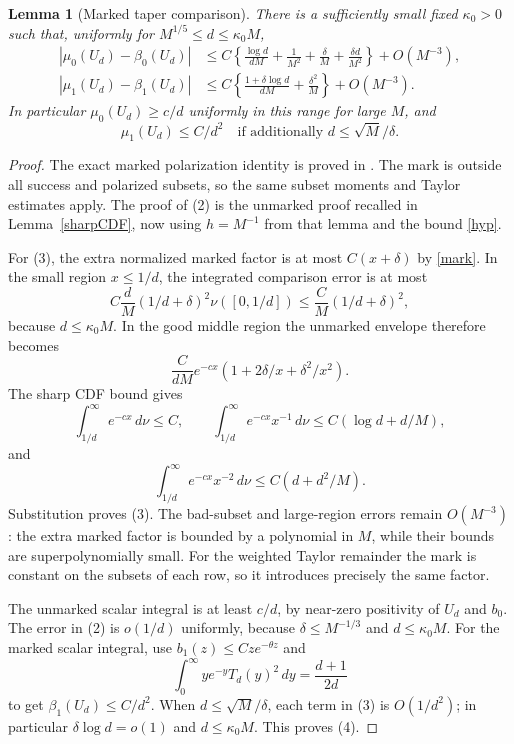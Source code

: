 \documentclass[11pt]{article}
\newtheorem{lemma}{Lemma}
\begin{document}
\begin{lemma}[Marked taper comparison]\label{marked}
There is a sufficiently small fixed $\kappa_0>0$ such that, uniformly
for $M^{1/5}\le d\le\kappa_0M$,
\begin{align}
 |\mu_0(U_d)-\beta_0(U_d)|
 &\le C\left\{\frac{\log d}{dM}+\frac1{M^2}
                  +\frac\delta M+\frac{\delta d}{M^2}\right\}
        +O(M^{-3}),                                  \tag{2}\\
 |\mu_1(U_d)-\beta_1(U_d)|
 &\le C\left\{\frac{1+\delta\log d}{dM}
                         +\frac{\delta^2}M\right\}
        +O(M^{-3}).                                  \tag{3}
\end{align}
In particular $\mu_0(U_d)\ge c/d$ uniformly in this range for large
$M$, and
\[
 \mu_1(U_d)\le C/d^2
 \quad\text{if additionally }d\le \sqrt M/\delta.
                                                               \tag{4}
 \]
\end{lemma}
\begin{proof}
The exact marked polarization identity is proved in
.
The mark is outside all success and polarized subsets, so the same
subset moments and Taylor estimates apply. The proof of (2) is the
unmarked proof recalled in Lemma~\ref{sharpCDF}, now using
$h=M^{-1}$ from that lemma and the bound \eqref{hyp}.

For (3), the extra normalized marked factor is at most $C(x+\delta)$
by \eqref{mark}. In the small region $x\le1/d$, the integrated
comparison error is at most
\[
 C\frac dM(1/d+\delta)^2\nu([0,1/d])
 \le\frac CM(1/d+\delta)^2,
\]
because $d\le\kappa_0M$. In the good middle region the unmarked
envelope therefore becomes
\[
 \frac C{dM}e^{-cx}
          (1+2\delta/x+\delta^2/x^2).
\]
The sharp CDF bound gives
\[
 \int_{1/d}^\infty e^{-cx}\,d\nu\le C,\qquad
 \int_{1/d}^\infty e^{-cx}x^{-1}\,d\nu
       \le C(\log d+d/M),
\]
and
\[
 \int_{1/d}^\infty e^{-cx}x^{-2}\,d\nu
       \le C(d+d^2/M).
\]
Substitution proves (3). The bad-subset and large-region errors
remain $O(M^{-3})$: the extra marked factor is bounded by a
polynomial in $M$, while their bounds are superpolynomially small.
For the weighted Taylor remainder the mark is constant on the
subsets of each row, so it introduces precisely the same factor.

The unmarked scalar integral is at least $c/d$, by near-zero
positivity of $U_d$ and $b_0$. The error in (2) is $o(1/d)$ uniformly,
because $\delta\le M^{-1/3}$ and $d\le\kappa_0M$.
For the marked scalar integral, use $b_1(z)\le Cz e^{-\theta z}$ and
\[
 \int_0^\infty y e^{-y}T_d(y)^2\,dy=\frac{d+1}{2d}
\]
to get $\beta_1(U_d)\le C/d^2$.
When $d\le\sqrt M/\delta$, each term in (3) is $O(1/d^2)$;
in particular $\delta\log d=o(1)$ and $d\le\kappa_0M$.
This proves (4).
\end{proof}
\end{document}
